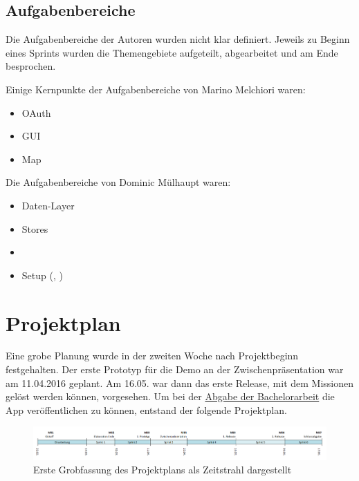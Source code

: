 \subsection*{Aufgabenbereiche}
Die Aufgabenbereiche der Autoren wurden nicht klar definiert. 
Jeweils zu Beginn eines Sprints wurden die Themengebiete aufgeteilt, abgearbeitet und am Ende besprochen. 

Einige Kernpunkte der Aufgabenbereiche von Marino Melchiori waren:
\begin{itemize}
	\item \gls{OAuth}
	\item \gls{GUI}
	\item Map
\end{itemize}

Die Aufgabenbereiche von Dominic Mülhaupt waren:
\begin{itemize}
	\item Daten-Layer
	\item Stores
	\item {}
	\item Setup (, )
\end{itemize}




\section{Projektplan}
\label{pm-projektplan}

Eine grobe Planung wurde in der zweiten Woche nach Projektbeginn festgehalten. 
Der erste Prototyp für die Demo an der Zwischenpräsentation war am 11.04.2016 geplant. 
Am 16.05. war dann das erste Release, mit dem Missionen gelöst werden können, vorgesehen. 
Um bei der \hyperref[pm-projektmanagement-risikomanagement-r01]{Abgabe der Bachelorarbeit} die App veröffentlichen zu können, entstand der folgende Projektplan.

\begin{figure}[H]
	\centering
	\includegraphics[width=\textwidth]{images/projektmanagement/zeitstrahl_v1.png}
	\caption{Erste Grobfassung des Projektplans als Zeitstrahl dargestellt}
	\label{image-project-plan-timeline1}
\end{figure}

